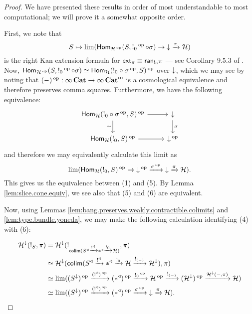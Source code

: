 \begin{proof}
We have presented these results in order of most understandable to most
computational; we will prove it a somewhat opposite order.


First, we note that 
$$S \mapsto \lim(\Hom_{\Ha\op}(S, !_0\op \circ \sigma) \to \down \xto{\pi} \Ha)$$
is the right Kan extension formula for $\ext_{\pi} \equiv
\term{ran}_{!_0} \pi$ --- see Corollary 9.5.3 of \cite{RV:Elements}. Now,
$\Hom_{\Ha\op}(S, !_0\op \circ \sigma) \simeq \Hom_{\Ha}(!_0 \circ \sigma\op,
S)\op$ over $\down$, which we may see by noting that $(-)\op : {\infty}\Cat \to {\infty}\Cat^{\term{co}}$ is a cosmological equivalence and therefore preserves
comma squares. Furthermore, we have the following equivalence:
\[
\begin{tikzcd}
{\Hom_{\Ha}(!_0 \circ \sigma\op, S)\op} \arrow[d, "\sim"'] \arrow[r] & \down \arrow[d, "\sigma"] \\
{\Hom_{\Ha}(!_0, S)\op} \arrow[r]                                    & \down\op                 
\end{tikzcd}
\]
and therefore we may equivalently calculate this limit as 
$$\lim(\Hom_{\Ha}(!_0, S)\op \to \down\op \xto{\sigma\op} \down \xto{\pi} \Ha).$$
This gives us the equivalence between (1) and (5). By Lemma
\ref{lem:slice.cone.equiv}, we see also that (5) and (6) are equivalent.

Now, using Lemmas \ref{lem:bang.preserves.weakly.contractible.colimits} and \ref{lem:type.bundle.yoneda}, we may make
the following calculation identifying (4) with (6):

\begin{align*}
  \Ha^{\down}(!_S, \pi) &= \Ha^{\down}(!_{\colim(S^{\triangleleft} \xto{!^{\triangleleft}} \ast^{\triangleleft} \xto{!_0} \Ha)}, \pi) \\
  &\simeq \Ha^{\down}(\colim(S^{\triangleleft} \xto{!^{\triangleleft}} \ast^{\triangleleft} \xto{!_0} \Ha \xto{!_{(-)}} \Ha^{\down}), \pi)\\
&\simeq \lim((S^{\down})\op \xto{(!^{\triangleleft})\op} (\ast^{\triangleleft})\op \xto{!_0\op} \Ha\op \xto{!_{(-)}} (\Ha^{\down})\op \xto{\Ha^{\down}(-, \pi)} \Ha) \\
&\simeq \lim((S^{\down})\op \xto{(!^{\triangleleft})\op} (\ast^{\triangleleft})\op \xto{\sigma\op} \down \xto{\pi} \Ha).
\end{align*}

\end{proof}

